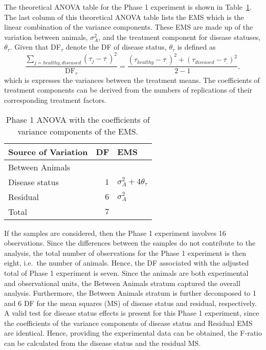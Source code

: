\documentclass[article]{jss}
\begin{document}
The theoretical ANOVA table for the Phase 1 experiment is shown in Table~\ref{tab:Phase1ANOVA}. The last column of this theoretical ANOVA table lists the EMS which is the linear combination of the variance components. These EMS are made up of the variation between animals, $\sigma_{A}^2$, and the treatment component for disease statuses, $\theta_{\tau}$. Given that DF$_{\tau}$ denote the DF of disease status, $\theta_{\tau}$ is defined as 
\[\frac{\displaystyle \sum_{j = healthy, diseased}(\tau_{j} - \overline{\tau_{.}})^2}{\mathrm{DF}_{\tau}}=
\frac{(\tau_{healthy} - \overline{\tau_{.}})^2 + (\tau_{diseased} - \overline{\tau_{.}})^2}{2-1},\] 
which is expresses the variances between the treatment means. The coefficients of treatment components can be derived from the numbers of replications of their corresponding treatment factors. 

\begin{table}[ht]
\centering
\caption{Phase 1 ANOVA with the coefficients of variance components of the EMS.}
\begin{tabular}[t]{lrl}
\toprule
\multicolumn{1}{l}{\textbf{Source of Variation}} & \multicolumn{1}{l}{\textbf{DF}} & \multicolumn{1}{l}{\textbf{EMS}}\\
\midrule
Between Animals 		\\
\hspace{3mm}Disease status 	& $1$ 	& $\sigma_{A}^2 + 4\theta_{\tau}$\\
\hspace{3mm}Residual		& $6$ 	& $\sigma_{A}^2$\\\hline
Total 						& $7$    & \\
\bottomrule
\end{tabular}
\label{tab:Phase1ANOVA}
\end{table}

If the samples are considered, then the Phase 1 experiment involves 16 observations. Since the differences between the samples do not contribute to the analysis, the total number of observations for the Phase 1 experiment is then eight, i.e.\ the number of animals. Hence, the DF associated with the adjusted total of Phase 1 experiment is seven. Since the animals are both experimental and observational units, the Between Animals stratum captured the overall analysis. Furthermore, the Between Animals stratum is further decomposed to 1 and 6 DF for the mean squares (MS) of disease status and residual, respectively. A valid test for disease status effects is present for this Phase 1 experiment, since the coefficients of the variance components of disease status and Residual EMS are identical. Hence, providing the experimental data can be obtained, the F-ratio can be calculated from the disease status and the residual MS. 
\end{document}
